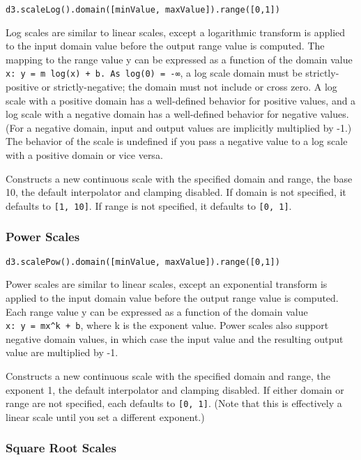 \documentclass[
  12pt,
]{krantz}
\begin{document}
\texttt{d3.scaleLog().domain({[}minValue,\ maxValue{]}).range({[}0,1{]})}

Log scales are similar to linear scales, except a logarithmic transform is applied to the input domain value before the output range value is computed. The mapping to the range value y can be expressed as a function of the domain value \texttt{x:\ y\ =\ m\ log(x)\ +\ b.\ As\ log(0)\ =\ -∞}, a log scale domain must be strictly-positive or strictly-negative; the domain must not include or cross zero. A log scale with a positive domain has a well-defined behavior for positive values, and a log scale with a negative domain has a well-defined behavior for negative values. (For a negative domain, input and output values are implicitly multiplied by -1.) The behavior of the scale is undefined if you pass a negative value to a log scale with a positive domain or vice versa.

Constructs a new continuous scale with the specified domain and range, the base 10, the default interpolator and clamping disabled. If domain is not specified, it defaults to \texttt{{[}1,\ 10{]}}. If range is not specified, it defaults to \texttt{{[}0,\ 1{]}}.

\hypertarget{power-scales}{%
\subsubsection*{Power Scales}\label{power-scales}}


\texttt{d3.scalePow().domain({[}minValue,\ maxValue{]}).range({[}0,1{]})}

Power scales are similar to linear scales, except an exponential transform is applied to the input domain value before the output range value is computed. Each range value y can be expressed as a function of the domain value \texttt{x:\ y\ =\ mx\^{}k\ +\ b}, where k is the exponent value. Power scales also support negative domain values, in which case the input value and the resulting output value are multiplied by -1.

Constructs a new continuous scale with the specified domain and range, the exponent 1, the default interpolator and clamping disabled. If either domain or range are not specified, each defaults to \texttt{{[}0,\ 1{]}}. (Note that this is effectively a linear scale until you set a different exponent.)

\hypertarget{square-root-scales}{%
\subsubsection*{Square Root Scales}\label{square-root-scales}}
\end{document}

